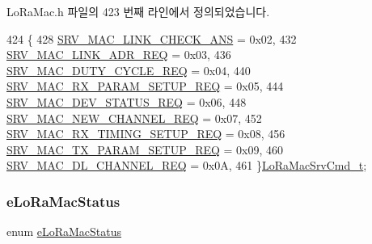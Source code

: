 Lo\+Ra\+Mac.\+h 파일의 423 번째 라인에서 정의되었습니다.


\begin{DoxyCode}
424 \{
428     \mbox{\hyperlink{group___l_o_r_a_m_a_c_ggac91cc4dc69ad7de2426360f9f1f2d079ac9df0550be22a470d4f68681ee97191c}{SRV\_MAC\_LINK\_CHECK\_ANS}}           = 0x02,
432     \mbox{\hyperlink{group___l_o_r_a_m_a_c_ggac91cc4dc69ad7de2426360f9f1f2d079af7fc388963e2bb713062bd51960ed4cc}{SRV\_MAC\_LINK\_ADR\_REQ}}             = 0x03,
436     \mbox{\hyperlink{group___l_o_r_a_m_a_c_ggac91cc4dc69ad7de2426360f9f1f2d079ae1175fb1d39611d84efb70f141064fbf}{SRV\_MAC\_DUTY\_CYCLE\_REQ}}           = 0x04,
440     \mbox{\hyperlink{group___l_o_r_a_m_a_c_ggac91cc4dc69ad7de2426360f9f1f2d079a534efe0aaa23bc72032a0e8b0335832b}{SRV\_MAC\_RX\_PARAM\_SETUP\_REQ}}       = 0x05,
444     \mbox{\hyperlink{group___l_o_r_a_m_a_c_ggac91cc4dc69ad7de2426360f9f1f2d079ac98ae516df5419b24285a74da2d58d7f}{SRV\_MAC\_DEV\_STATUS\_REQ}}           = 0x06,
448     \mbox{\hyperlink{group___l_o_r_a_m_a_c_ggac91cc4dc69ad7de2426360f9f1f2d079a34e94bc23cacf1ab088ae1010e55efeb}{SRV\_MAC\_NEW\_CHANNEL\_REQ}}          = 0x07,
452     \mbox{\hyperlink{group___l_o_r_a_m_a_c_ggac91cc4dc69ad7de2426360f9f1f2d079aa24b1505ef48247c1d2a3d486d603686}{SRV\_MAC\_RX\_TIMING\_SETUP\_REQ}}      = 0x08,
456     \mbox{\hyperlink{group___l_o_r_a_m_a_c_ggac91cc4dc69ad7de2426360f9f1f2d079a6b15b371027770899224e613bbe162a8}{SRV\_MAC\_TX\_PARAM\_SETUP\_REQ}}       = 0x09,
460     \mbox{\hyperlink{group___l_o_r_a_m_a_c_ggac91cc4dc69ad7de2426360f9f1f2d079ae3385a6aa575b3ac756c362dbbc8c39f}{SRV\_MAC\_DL\_CHANNEL\_REQ}}           = 0x0A,
461 \}\mbox{\hyperlink{group___l_o_r_a_m_a_c_gabf2096aa70e466d0403f90200fab17b5}{LoRaMacSrvCmd\_t}};
\end{DoxyCode}
\mbox{\label{group___l_o_r_a_m_a_c_ga1d18f26b344040b3ec5c3db662919661}} 
\subsubsection{\texorpdfstring{e\+Lo\+Ra\+Mac\+Status}{eLoRaMacStatus}}
{\footnotesize\ttfamily enum \mbox{\hyperlink{group___l_o_r_a_m_a_c_ga1d18f26b344040b3ec5c3db662919661}{e\+Lo\+Ra\+Mac\+Status}}}

